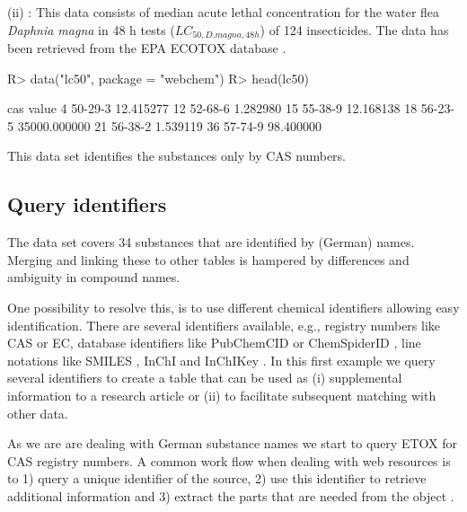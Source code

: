 \documentclass[article]{jss}
\begin{document}
(ii) : This data consists of median acute lethal concentration for the water flea \textit{Daphnia magna} in 48 h tests ($LC_{50, D.magna, 48h}$) of 124 insecticides.
The data has been retrieved from the EPA ECOTOX database \citep{epa_2016}.
%
\begin{CodeChunk}
\begin{CodeInput}
R> data("lc50", package = "webchem")
R> head(lc50)
\end{CodeInput}
\begin{CodeOutput}
       cas        value
4  50-29-3    12.415277
12 52-68-6     1.282980
15 55-38-9    12.168138
18 56-23-5 35000.000000
21 56-38-2     1.539119
36 57-74-9    98.400000
\end{CodeOutput}
\end{CodeChunk}
%
This data set identifies the substances only by CAS numbers.


\subsection[Query identifiers]{Query identifiers}
The  data set covers 34 substances that are identified by (German) names.
Merging and linking these to other tables is hampered by differences and ambiguity in compound names.

One possibility to resolve this, is to use different chemical
identifiers allowing easy identification.  There are several
identifiers available, e.g., registry numbers like CAS or EC, database
identifiers like PubChemCID \citep{Kim_2016} or ChemSpiderID
\citep{pence_chemspider:_2010}, line notations like SMILES
\citep{Weininger_1990}, InChI and InChIKey
\citep{Heller_McNaught_Pletnev_Stein_Tchekhovskoi_2015}.  In this
first example we query several identifiers to create a table that can
be used as (i) supplemental information to a research article or (ii)
to facilitate subsequent matching with other data.

As we are are dealing with German substance names we start to query ETOX for CAS registry numbers.
A common work flow when dealing with web resources is to 1) query a unique identifier of the source, 2) use this identifier to retrieve additional information and 3) extract the parts that are needed from the  object \citep{Chamberlain_Szocs_2013}.
\end{document}
